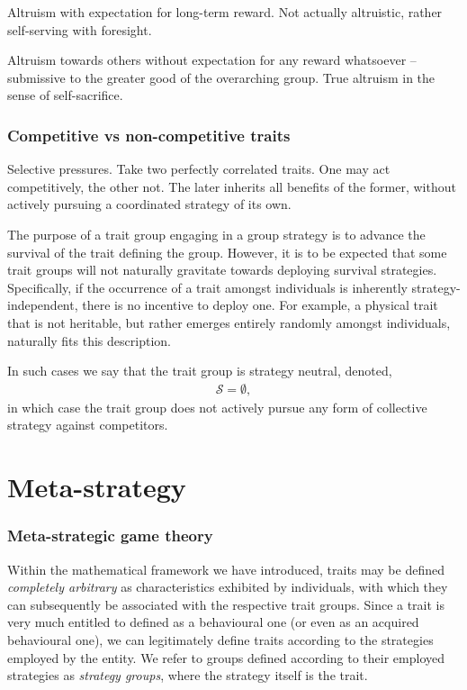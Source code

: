 \documentclass[twocolumn, aps, rmp, amsmath, amssymb, nofootinbib, superscriptaddress, longbibliography, floatfix, table-of-contents, eqsecnum]{revtex4-1}
\begin{document}
Altruism with expectation for long-term reward. Not actually altruistic, rather self-serving with foresight.

Altruism towards others without expectation for any reward whatsoever -- submissive to the greater good of the overarching group. True altruism in the sense of self-sacrifice.

\section{Competitive vs non-competitive traits}

Selective pressures. Take two perfectly correlated traits. One may act competitively, the other not. The later inherits all benefits of the former, without actively pursuing a coordinated strategy of its own.

The purpose of a trait group engaging in a group strategy is to advance the survival of the trait defining the group. However, it is to be expected that some trait groups will not naturally gravitate towards deploying survival strategies. Specifically, if the occurrence of a trait amongst individuals is inherently strategy-independent, there is no incentive to deploy one. For example, a physical trait that is not heritable, but rather emerges entirely randomly amongst individuals, naturally fits this description.

In such cases we say that the trait group is strategy neutral, denoted,
\begin{align}
	\mathcal{S}=\emptyset,
\end{align}
in which case the trait group does not actively pursue any form of collective strategy against competitors.

%
%

\part{Meta-strategy}

\section{Meta-strategic game theory}

Within the mathematical framework we have introduced, traits may be defined \textit{completely arbitrary} as characteristics exhibited by individuals, with which they can subsequently be associated with the respective trait groups. Since a trait is very much entitled to defined as a behavioural one (or even as an acquired behavioural one), we can legitimately define traits according to the strategies employed by the entity. We refer to groups defined according to their employed strategies as \textit{strategy groups}, where the strategy itself is the trait.
\end{document}
